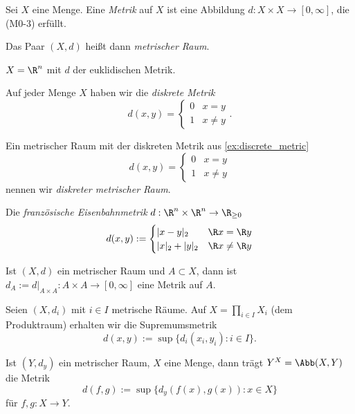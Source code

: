 \begin{df}
	Sei $X$ eine Menge.
	Eine \emph{Metrik} auf $X$ ist eine Abbildung $d : X \times X \to [0, \infty]$, die (M0-3) erfüllt.

	Das Paar $(X,d)$ heißt dann \emph{metrischer Raum}.
\end{df}

\begin{ex}
	$X = \R^n$ mit $d$ der euklidischen Metrik.
\end{ex}

\begin{ex} \label{ex:discrete_metric}
	Auf jeder Menge $X$ haben wir die \emph{diskrete Metrik}
	\[
		d(x,y) = \begin{cases}
			0 & x=y \\
			1 & x\neq y
		\end{cases}.
	\]
\end{ex}

\begin{df}
	Ein metrischer Raum mit der diskreten Metrik aus \ref{ex:discrete_metric}
	\[
		d(x,y) = \begin{cases}
			0 & x=y \\
			1 & x\neq y
		\end{cases}
	\]
	nennen wir \emph{diskreter metrischer Raum}.
\end{df}

\begin{ex}
	Die \emph{französische Eisenbahnmetrik} $d: \R^n \times \R^n \to \R_{\ge 0}$
	\[
		d(x,y) := \begin{cases}
			|x-y|_2 & \R x = \R y \\
			|x|_2 + |y|_2 & \R x \neq \R y
		\end{cases}
	\]
\end{ex}

\begin{ex}[Teilräume]
	Ist $(X,d)$ ein metrischer Raum und $A \subset X$, dann ist $d_A := d\big|_{A\times A} : A \times A \to [0,\infty]$ eine Metrik auf $A$.
\end{ex}

\begin{ex}[Produkträume]
	Seien $(X,d_i)$ mit $i \in I$ metrische Räume.
	Auf $X = \prod_{i\in I} X_i$ (dem Produktraum) erhalten wir die Supremumsmetrik
	\[
		d(x,y) := \sup \{ d_i(x_i,y_i) : i \in I \}.
	\]
\end{ex}

\begin{ex}[Abbildungsräume]
	Ist $(Y,d_y)$ ein metrischer Raum, $X$ eine Menge, dann trägt $Y^X = \Abb(X,Y)$ die Metrik
	\[
		d(f,g) := \sup \{ d_y(f(x),g(x)) : x \in X \}
	\]
	für $f,g : X \to Y$.
\end{ex}

